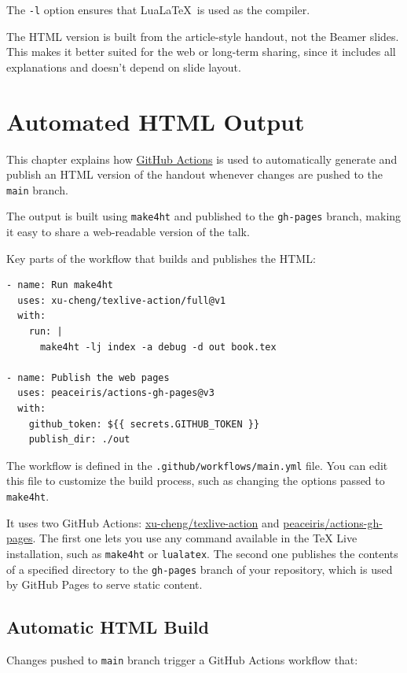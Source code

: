 \documentclass{book}
\begin{document}
The \verb|-l| option  ensures that Lua\LaTeX\ is used as the compiler. 


The HTML version is built from the article-style handout, not the Beamer slides.
This makes it better suited for the web or long-term sharing, since it includes
all explanations and doesn’t depend on slide layout.

\chapter{Automated HTML Output}

This chapter explains how \href{https://docs.github.com/en/actions/writing-workflows/quickstart}{GitHub Actions}
is used to automatically generate and publish an HTML version of the handout whenever changes are pushed to the \texttt{main} branch.

The output is built using \texttt{make4ht} and published to the \texttt{gh-pages} branch,
making it easy to share a web-readable version of the talk.

Key parts of the workflow that builds and publishes the HTML:

\begin{verbatim}
- name: Run make4ht
  uses: xu-cheng/texlive-action/full@v1
  with:
    run: |
      make4ht -lj index -a debug -d out book.tex

- name: Publish the web pages
  uses: peaceiris/actions-gh-pages@v3
  with:
    github_token: ${{ secrets.GITHUB_TOKEN }}
    publish_dir: ./out
\end{verbatim}



The workflow is defined in the \texttt{.github/workflows/main.yml} file.
You can edit this file to customize the build process, such as changing the options passed to \texttt{make4ht}.

It uses two GitHub Actions: \href{https://github.com/xu-cheng/texlive-action}{xu-cheng/texlive-action}
and \href{https://github.com/peaceiris/actions-gh-pages}{peaceiris/actions-gh-pages}.
The first one lets you use any command available in the TeX Live installation, such as \texttt{make4ht} or \texttt{lualatex}.
The second one publishes the contents of a specified directory to the \texttt{gh-pages} branch of your repository,
which is used by GitHub Pages to serve static content.



\section{Automatic HTML Build}
Changes pushed to \texttt{main} branch trigger a GitHub Actions workflow that:
\end{document}
